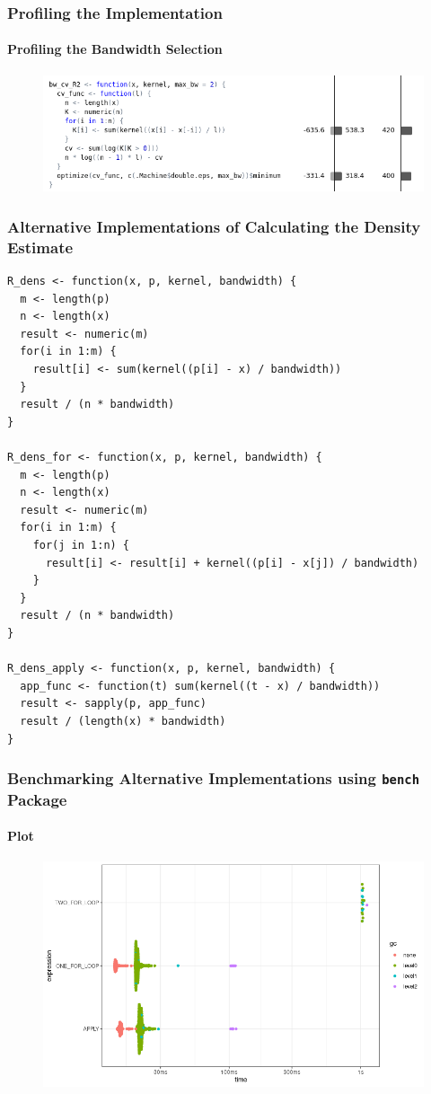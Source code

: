 \documentclass[aspectratio=169]{beamer}
\begin{document}
\begin{frame}[fragile]
  \frametitle{Profiling the Implementation}
  \framesubtitle{Profiling the Bandwidth Selection}
  \begin{figure}
    \centering
    \includegraphics[scale = 0.5]{figure/BW_profile.png}
  \end{figure}
\end{frame}
\begin{frame}[fragile]
  \frametitle{Alternative Implementations of Calculating the Density Estimate}
\begin{verbatim}
R_dens <- function(x, p, kernel, bandwidth) {
  m <- length(p)
  n <- length(x)
  result <- numeric(m)
  for(i in 1:m) {
    result[i] <- sum(kernel((p[i] - x) / bandwidth))
  }
  result / (n * bandwidth)
}

R_dens_for <- function(x, p, kernel, bandwidth) {
  m <- length(p)
  n <- length(x)
  result <- numeric(m)
  for(i in 1:m) {
    for(j in 1:n) {
      result[i] <- result[i] + kernel((p[i] - x[j]) / bandwidth)
    }
  }
  result / (n * bandwidth)
}

R_dens_apply <- function(x, p, kernel, bandwidth) {
  app_func <- function(t) sum(kernel((t - x) / bandwidth))
  result <- sapply(p, app_func)
  result / (length(x) * bandwidth)
}
\end{verbatim}
\end{frame}
\begin{frame}
  \frametitle{Benchmarking Alternative Implementations using \texttt{bench} Package}
  \framesubtitle{Plot}
  \begin{figure}
    \centering
    \includegraphics[scale = 0.5]{figure/ForVsApply.png}
  \end{figure}
\end{frame}
\end{document}
